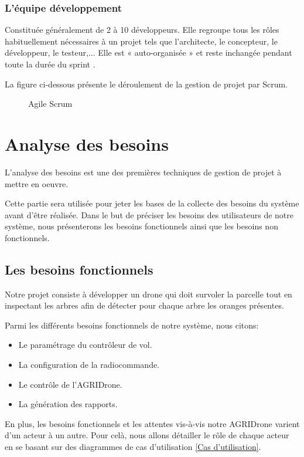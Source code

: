 \subsubsection{L'équipe développement  }
Constituée généralement de 2 à 10 développeurs. Elle regroupe tous les rôles habituellement nécessaires à un projet tels que l'architecte, le concepteur, le développeur, le testeur,... Elle est « auto-organisée » et reste inchangée pendant toute la durée du sprint \cite{Crochet}.

La figure ci-dessous présente le déroulement de la gestion de projet par Scrum.

\begin{figure} [H]
	\begin{center}
		\centering
	\end{center}
	\caption{Agile Scrum}
\end{figure}
	\section{Analyse des besoins }	
	L'analyse des besoins est une des premières techniques de gestion de projet à mettre en oeuvre.
	
	Cette partie sera utilisée pour jeter les bases de la collecte des besoins du système avant d'être réalisée.
	Dans le but de préciser les besoins des utilisateurs de notre système, nous présenterons les besoins fonctionnels ainsi que les besoins non fonctionnels.
	
	\subsection{Les besoins fonctionnels}
	Notre projet consiste à développer un drone qui doit survoler la parcelle tout en inspectant les arbres afin de détecter pour chaque arbre les oranges présentes.
	
	Parmi les différents besoins fonctionnels de notre système, nous citons:
	\begin{itemize}
		\item Le paramétrage du contrôleur de vol. 
		\item  La configuration de la radiocommande. 
		\item Le contrôle de l'AGRIDrone.
		\item La génération des rapports. 
	\end{itemize} 
	
	En plus, les besoins fonctionnels et les attentes vis-à-vis notre AGRIDrone varient d'un acteur à un autre. Pour celà, nous allons détailler le rôle de chaque acteur en se basant sur des diagrammes de cas d'utilisation \ref{Cas d'utilisation}.
	

